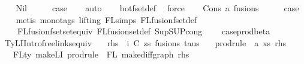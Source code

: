 \begin{isabellebody}
\ \ \isamarkupfalse%
\ Nil\isanewline
\ \ \isamarkupfalse%
\ \isamarkupfalse%
\ {\isacharquery}{\kern0pt}case\isanewline
\ \ \isamarkupfalse%
\ auto\isanewline
\ \ \isamarkupfalse%
\ bot{\isacharunderscore}{\kern0pt}fset{\isacharunderscore}{\kern0pt}def\ \isamarkupfalse%
\ force\isanewline
{}\isamarkupfalse%
\isanewline
\ \ \isamarkupfalse%
\ {\isacharparenleft}{\kern0pt}Cons\ a\ fusions{\isacharparenright}{\kern0pt}\isanewline
\ \ \isamarkupfalse%
\ \isamarkupfalse%
\ {\isacharquery}{\kern0pt}case\isanewline
\ \ \isamarkupfalse%
\ {\isacharparenleft}{\kern0pt}metis\ {\isacharparenleft}{\kern0pt}mono{\isacharunderscore}{\kern0pt}tags{\isacharcomma}{\kern0pt}\ lifting{\isacharparenright}{\kern0pt}\ FL{\isachardot}{\kern0pt}simps{\isacharparenleft}{\kern0pt}{}{\isacharparenright}{\kern0pt}\ FLfusion{\isacharunderscore}{\kern0pt}fset{\isacharunderscore}{\kern0pt}def\isanewline
\ \ \ \ FLfusion{\isacharunderscore}{\kern0pt}fset{\isacharunderscore}{\kern0pt}set{\isacharunderscore}{\kern0pt}equiv\ FLfusion{\isacharunderscore}{\kern0pt}set{\isacharunderscore}{\kern0pt}def\ Sup{\isachardot}{\kern0pt}SUP{\isacharunderscore}{\kern0pt}cong\isanewline
\ \ \ \ case{\isacharunderscore}{\kern0pt}prod{\isacharunderscore}{\kern0pt}beta{\isacharparenright}{\kern0pt}\isanewline
{}\isamarkupfalse%
%
\endisatagproof
{\isafoldproof}%
%
\isadelimproof
\isanewline
%
\endisadelimproof
\isanewline
\isanewline
\isanewline
{}\isamarkupfalse%
\ TyLIIntro{\isacharunderscore}{\kern0pt}freelinks{\isacharunderscore}{\kern0pt}equiv{\isacharcolon}{\kern0pt}\isanewline
\ \ \ {\isachardoublequoteopen}rhs\ {\isacharequal}{\kern0pt}\ {\isacharparenleft}{\kern0pt}i{\isacharcomma}{\kern0pt}\ {\isacharparenleft}{\kern0pt}C{\isacharcomma}{\kern0pt}\ zs{\isacharparenright}{\kern0pt}{\isacharcomma}{\kern0pt}\ fusions{\isacharcomma}{\kern0pt}\ taus{\isacharparenright}{\kern0pt}{\isachardoublequoteclose}\isanewline
\ \ \ {\isachardoublequoteopen}prodrule\ {\isacharequal}{\kern0pt}\ {\isacharparenleft}{\kern0pt}{\isacharparenleft}{\kern0pt}a{\isacharcomma}{\kern0pt}\ xs{\isacharparenright}{\kern0pt}{\isacharcomma}{\kern0pt}\ rhs{\isacharparenright}{\kern0pt}{\isachardoublequoteclose}\isanewline
\ \ \ {\isachardoublequoteopen}FLty\ {\isacharparenleft}{\kern0pt}make{\isacharunderscore}{\kern0pt}LI\ prodrule{\isacharparenright}{\kern0pt}\ {\isacharequal}{\kern0pt}\ FL\ {\isacharparenleft}{\kern0pt}make{\isacharunderscore}{\kern0pt}diffgraph\ rhs{\isacharparenright}{\kern0pt}{\isachardoublequoteclose}\isanewline

\end{isabellebody}

